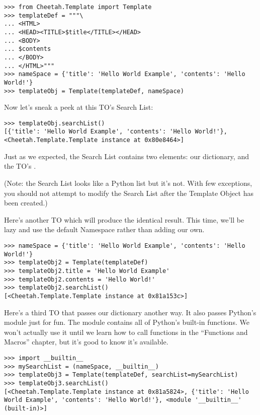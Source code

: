 \begin{verbatim}
>>> from Cheetah.Template import Template
>>> templateDef = """\
... <HTML>
... <HEAD><TITLE>$title</TITLE></HEAD>
... <BODY>
... $contents
... </BODY>
... </HTML>"""
>>> nameSpace = {'title': 'Hello World Example', 'contents': 'Hello World!'}
>>> templateObj = Template(templateDef, nameSpace)
\end{verbatim}

Now let's sneak a peek at this TO's Search List:

\begin{verbatim}
>>> templateObj.searchList()
[{'title': 'Hello World Example', 'contents': 'Hello World!'}, 
<Cheetah.Template.Template instance at 0x80e8464>]
\end{verbatim}

Just as we expected, the Search List contains two elements: our 
\code{nameSpace} dictionary, and the TO's \code{self}.

(Note: the Search List looks like a Python list but it's not.  With few
exceptions, you should not attempt to modify the Search List after the Template
Object has been created.)

Here's another TO which will produce the identical result.  This time, we'll be
lazy and use the default Namespace rather than adding our own.

\begin{verbatim}
>>> nameSpace = {'title': 'Hello World Example', 'contents': 'Hello World!'}
>>> templateObj2 = Template(templateDef)
>>> templateObj2.title = 'Hello World Example'
>>> templateObj2.contents = 'Hello World!'
>>> templateObj2.searchList()
[<Cheetah.Template.Template instance at 0x81a153c>]
\end{verbatim}

Here's a third TO that passes our  dictionary
another way.  It also passes Python's  module just for
fun.  The \code{\_\_builtin\_\_} module contains all of Python's built-in
functions.  We won't actually use it until we learn how to call functions in
the ``Functions and Macros'' chapter, but it's good to know it's available.

\begin{verbatim}
>>> import __builtin__
>>> mySearchList = (nameSpace, __builtin__)
>>> templateObj3 = Template(templateDef, searchList=mySearchList)
>>> templateObj3.searchList()
[<Cheetah.Template.Template instance at 0x81a5824>, {'title': 'Hello World Example', 'contents': 'Hello World!'}, <module '__builtin__' (built-in)>]
\end{verbatim}

